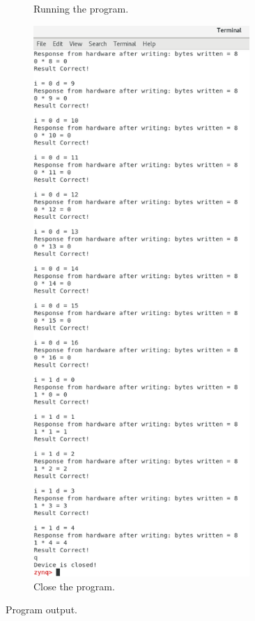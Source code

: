 \documentclass[11pt,letterpaper,titlepage]{article}
\begin{document}
\begin{figure}[h!]
\begin{subfigure}[b]{0.49\textwidth}
    \caption{Running the program.}
    \end{subfigure}
    \begin{subfigure}[b]{0.49\textwidth}
    \includegraphics[width=0.9\textwidth]{Close.png}
    \caption{Close the program.}
    \end{subfigure}
    \caption{Program output.}
\end{figure}
\end{document}
